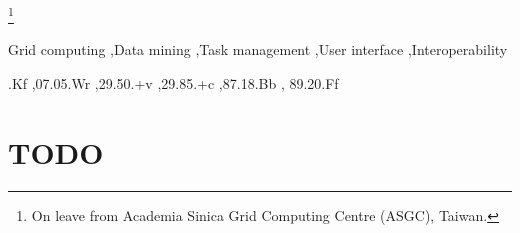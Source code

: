 \documentclass{elsart}
\def\ganga {\textsc{Ganga}\xspace}
\def\grid {Grid\xspace}
\begin{document}
\begin{frontmatter}
\thanks[HurngChun]{On leave from Academia Sinica Grid Computing Centre (ASGC),
  Taiwan.}

\begin{abstract}
  We present the computational task-management tool \ganga, which allows for
  the specification, submission, bookkeeping and post processing of
  computational tasks on a wide set of distributed resources.  \ganga
  effectively provides a homogeneous environment for processing data on
  heterogeneous resources. We give examples from High Energy Physics,
  demonstrating how an analysis can be developed on a local system and then
  transparently moved to a \grid system for processing of all available data.
  \ganga has an API that can be used via an interactive interface, in
  scripts, or through a GUI. Specific knowledge about types of tasks or
  computational resources is provided at run-time through a plugin system, 
  making new developments easy to integrate. We give an overview of the
  \ganga architecture, give examples of current use, and demonstrate how
  \ganga can be used in many different areas of science.
\end{abstract}

\begin{keyword}
Grid computing \sep Data mining \sep Task management \sep User interface \sep Interoperability






  .Kf \sep 07.05.Wr \sep 29.50.+v \sep 29.85.+c \sep 87.18.Bb \sep
  89.20.Ff
\end{keyword}
\end{frontmatter}


\section{TODO}
\end{document}
